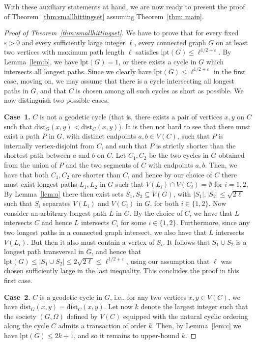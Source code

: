 \documentclass[11pt,reqno]{article}
\begin{document}
With these auxiliary statements at hand, we are now ready to present the proof of Theorem~\ref{thm:smallhittingset} assuming Theorem~\ref{thm: main}.

\begin{proof}[Proof of Theorem~\ref{thm:smallhittingset}]
We have to prove that for every fixed $\varepsilon>0$ and every sufficiently large integer $\ell$, every connected graph $G$ on at least two vertices with maximum path length $\ell$ satisfies $\mathrm{lpt}(G)\le \ell^{1/2+\varepsilon}$.  By Lemma~\ref{lem:b}, we have $\mathrm{lpt}(G)=1$, or there exists a cycle in $G$ which intersects all longest paths. Since we clearly have $\mathrm{lpt}(G)\le \ell^{1/2+\varepsilon}$ in the first case, moving on, we may assume that there is a cycle intersecting all longest paths in $G$, and that $C$ is chosen among all such cycles as short as possible. We now distinguish two possible cases.

\textbf{Case~1.} $C$ is not a geodetic cycle (that is, there exists a pair of vertices $x,y$ on $C$ such that $\mathrm{dist}_G(x,y)<\mathrm{dist}_C(x,y)$). It is then not hard to see that there must exist a path $P$ in $G$, with distinct endpoints $a,b\in V(C)$, such that $P$ is internally vertex-disjoint from $C$, and such that $P$ is strictly shorter than the shortest path between $a$ and $b$ on $C$. Let $C_1, C_2$ be the two cycles in $G$ obtained from the union of $P$ and the two segments of $C$ with endpoints $a,b$. Then, we have that both $C_1, C_2$ are shorter than $C$, and hence by our choice of $C$ there must exist longest paths $L_1, L_2$ in $G$ such that $V(L_i)\cap V(C_i)=\emptyset$ for $i=1,2$. By Lemma~\ref{lem:a} there then exist sets $S_1, S_2\subseteq V(G)$, with $|S_1|, |S_2|\le \sqrt{2\ell}$ such that $S_i$ separates $V(L_i)$ and $V(C_i)$ in $G$, for both $i\in \{1,2\}$. Now consider an arbitrary longest path $L$ in $G$. By the choice of $C$, we have that $L$ intersects $C$ and hence $L$ intersects $C_i$ for some $i\in \{1,2\}$. Furthermore, since any two longest paths in a connected graph intersect, we also have that $L$ intersects $V(L_i)$. But then it also must contain a vertex of $S_i$. It follows that $S_1\cup S_2$ is a longest path transversal in $G$, and hence that $\mathrm{lpt}(G)\le |S_1\cup S_2|\le 2\sqrt{2\ell}\le \ell^{1/2+\varepsilon}$, using our assumption that $\ell$ was chosen sufficiently large in the last inequality. This concludes the proof in this first case.


\textbf{Case~2.} $C$ is a geodetic cycle in $G$, i.e., for any two vertices $x,y\in V(C)$, we have $\mathrm{dist}_G(x,y)=\mathrm{dist}_C(x,y)$. Let now $k$ denote the largest integer such that the society $(G,\Omega)$ defined by $V(C)$ equipped with the natural cyclic ordering along the cycle $C$ admits a transaction of order $k$. Then, by Lemma~\ref{lem:c} we have $\mathrm{lpt}(G)\le 2k+1$, and so it remains to upper-bound $k$. 


\end{proof}
\end{document}
